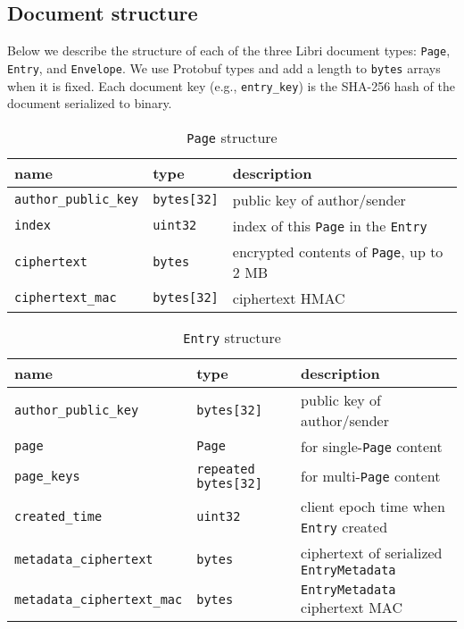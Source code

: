 \documentclass[10pt]{article}
\newcommand{\ttt}[1]{\texttt{#1}}
\def\Entry{\ttt{Entry}}
\def\Page{\ttt{Page}}
\def\Envelope{\ttt{Envelope}}
\begin{document}
\begin{appendices}

\section{Document structure}
\label{app:docs}

Below we describe the structure of each of the three Libri document types: \Page{}, \Entry{}, and \Envelope{}. We use Protobuf types and add a length to \ttt{bytes} arrays when it is fixed. Each document key (e.g., \ttt{entry\_key}) is the SHA-256 hash of the document serialized to binary.

\begin{table}[htbp]
	\caption*{\Page{} structure}
	\begin{small}
	\begin{tabular}{lll}
		\toprule
		name & type  & description \\ \midrule
		\ttt{author\_public\_key} & \ttt{bytes[32]} & public key of author/sender \\
		\ttt{index} & \ttt{uint32} & index of this \Page{} in the \Entry{} \\
		\ttt{ciphertext} & \ttt{bytes} & encrypted contents of \Page{}, up to 2 MB \\
		\ttt{ciphertext\_mac} & \ttt{bytes[32]} & ciphertext HMAC \\
		\bottomrule
	\end{tabular}
	\end{small}
\end{table}

\begin{table}[htbp]
	\caption*{\Entry{} structure}
	\begin{small}
	\begin{tabular}{lll}
		\toprule
		name & type  & description \\ \midrule
		\ttt{author\_public\_key} & \ttt{bytes[32]} & public key of author/sender \\
		\ttt{page} & \ttt{Page} & for single-\Page{} content \\
		\ttt{page\_keys} & \ttt{repeated bytes[32]} & for multi-\Page{} content \\
		\ttt{created\_time} & \ttt{uint32} & client epoch time when \Entry{} created \\
		\ttt{metadata\_ciphertext} & \ttt{bytes} & ciphertext of serialized \ttt{EntryMetadata} \\
		\ttt{metadata\_ciphertext\_mac} & \ttt{bytes} & \ttt{EntryMetadata} ciphertext MAC \\
		\bottomrule
	\end{tabular}
	\end{small}
\end{table}



\end{appendices}
\end{document}
